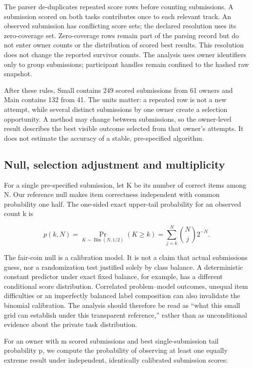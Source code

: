 The parser de-duplicates repeated score rows before counting submissions. A submission scored on both tasks contributes once to each relevant track. An observed submission has conflicting score sets; the declared resolution uses its zero-coverage set. Zero-coverage rows remain part of the parsing record but do not enter owner counts or the distribution of scored best results. This resolution does not change the reported survivor counts. The analysis uses owner identifiers only to group submissions; participant handles remain confined to the hashed raw snapshot.


After these rules, Small contains 249 scored submissions from 61 owners and Main contains 132 from 41. The units matter: a repeated row is not a new attempt, while several distinct submissions by one owner create a selection opportunity. A method may change between submissions, so the owner-level result describes the best visible outcome selected from that owner's attempts. It does not estimate the accuracy of a stable, pre-specified algorithm.


\subsection{Null, selection adjustment and multiplicity}

For a single pre-specified submission, let K be its number of correct items among N. Our reference null makes item correctness independent with common probability one half. The one-sided exact upper-tail probability for an observed count k is


\[
p(k,N)=\Pr_{K\sim\operatorname{Bin}(N,1/2)}(K\geq k)
=\sum_{j=k}^{N}\binom{N}{j}2^{-N}.
\]

The fair-coin null is a calibration model. It is not a claim that actual submissions guess, nor a randomization test justified solely by class balance. A deterministic constant predictor under exact fixed balance, for example, has a different conditional score distribution. Correlated problem--model outcomes, unequal item difficulties or an imperfectly balanced label composition can also invalidate the binomial calibration. The analysis should therefore be read as ``what this small grid can establish under this transparent reference,'' rather than as unconditional evidence about the private task distribution.


For an owner with m scored submissions and best single-submission tail probability p, we compute the probability of observing at least one equally extreme result under independent, identically calibrated submission scores:


